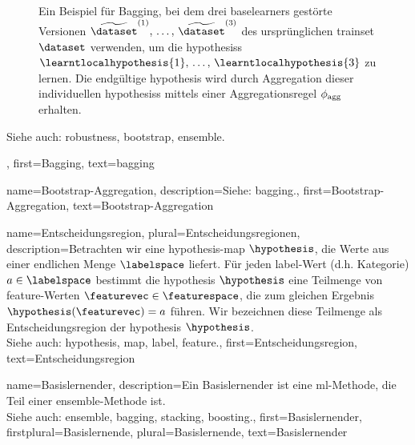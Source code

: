 {{{{{{\begin{figure}[htbp]
\begin{center}
        \caption{Ein Beispiel für Bagging, bei dem drei \glspl{baselearner} gestörte 
        Versionen $\widetilde{\dataset}^{(1)},\,\ldots,\,\widetilde{\dataset}^{(3)}$ 
        des ursprünglichen \gls{trainset} $\dataset$ verwenden, um die \glspl{hypothesis} 
        $\learntlocalhypothesis{1},\,\ldots,\,\learntlocalhypothesis{3}$ zu lernen. 
        Die endgültige \gls{hypothesis} wird durch Aggregation dieser individuellen 
        \glspl{hypothesis} mittels einer Aggregationsregel $\phi_{\rm agg}$ erhalten.}
        \end{center}
        \end{figure}
        Siehe auch: \gls{robustness}, \gls{bootstrap}, \gls{ensemble}.},
    first={Bagging},
    text={bagging}
}

{
    name={Bootstrap-Aggregation},
    description={Siehe: \gls{bagging}.},
    first={Bootstrap-Aggregation},
    text={Bootstrap-Aggregation}
}	

{
    name={Entscheidungsregion}, plural={Entscheidungsregionen},
    description={Betrachten wir eine \gls{hypothesis}-\gls{map} $\hypothesis$, die Werte aus einer endlichen Menge $\labelspace$ liefert. 
                 Für jeden \gls{label}-Wert (d.h. Kategorie) $a \in \labelspace$ bestimmt die \gls{hypothesis} $\hypothesis$ 
				 eine Teilmenge von \gls{feature}-Werten $\featurevec \in \featurespace$, die zum gleichen Ergebnis $\hypothesis(\featurevec)=a$ führen. 
                 Wir bezeichnen diese Teilmenge als Entscheidungsregion der \gls{hypothesis} $\hypothesis$.\\
                 Siehe auch: \gls{hypothesis}, \gls{map}, \gls{label}, \gls{feature}.},
    first={Entscheidungsregion},
    text={Entscheidungsregion}
}

{
    name={Basislernender}, 
    description={Ein Basislernender ist eine \gls{ml}-Methode, die Teil einer \gls{ensemble}-Methode ist.\\
                 Siehe auch: \gls{ensemble}, \gls{bagging}, \gls{stacking}, \gls{boosting}.},
    first={Basislernender},
    firstplural={Basislernende},
    plural={Basislernende},
    text={Basislernender}
}	

}}}}
